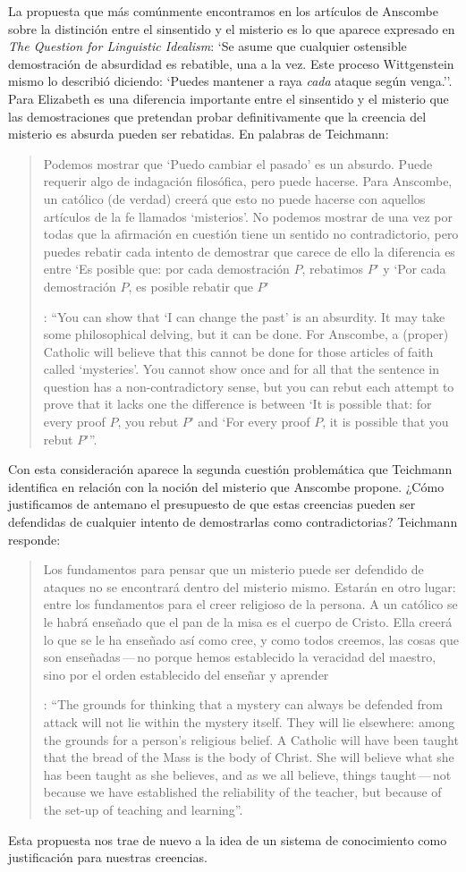La propuesta que más comúnmente encontramos en los artículos de Anscombe sobre la distinción entre el sinsentido y el misterio es lo que aparece expresado en \emph{The Question for Linguistic Idealism}: \enquote*{Se asume que cualquier ostensible demostración de absurdidad es rebatible, una a la vez. Este proceso Wittgenstein mismo lo describió diciendo: `Puedes mantener a raya \emph{cada} ataque según venga.'}. Para Elizabeth es una diferencia importante entre el sinsentido y el misterio que las demostraciones que pretendan probar definitivamente que la creencia del misterio es absurda pueden ser rebatidas. En palabras de Teichmann: \blockquote[{\Cite[213-214]{teichmann2008ans}}: \enquote{You can show that `I can change the past' is an absurdity. It may take some philosophical delving, but it can be done. For Anscombe, a (proper) Catholic will believe that this cannot be done for those articles of faith called `mysteries'. \textelp{} You cannot show once and for all that the sentence in question has a non-contradictory sense, but you can rebut each attempt to prove that it lacks one \textelp{} the difference is between `It is possible that: for every proof $P$, you rebut $P$' and `For every proof $P$, it is possible that you rebut $P$'}.]{Podemos mostrar que `Puedo cambiar el pasado' es un absurdo. Puede requerir algo de indagación filosófica, pero puede hacerse. Para Anscombe, un católico (de verdad) creerá que esto no puede hacerse con aquellos artículos de la fe llamados `misterios'. \textelp{} No podemos mostrar de una vez por todas que la afirmación en cuestión tiene un sentido no contradictorio, pero puedes rebatir cada intento de demostrar que carece de ello \textelp{} la diferencia es entre `Es posible que: por cada demostración $P$, rebatimos $P$' y `Por cada demostración $P$, es posible rebatir que $P$'}. Con esta consideración aparece la segunda cuestión problemática que Teichmann identifica en relación con la noción del misterio que Anscombe propone. ¿Cómo justificamos de antemano el presupuesto de que estas creencias pueden ser defendidas de cualquier intento de demostrarlas como contradictorias? Teichmann responde: \blockquote[{\Cite[213-214]{teichmann2008ans}}: \enquote{The grounds for thinking that a mystery can always be defended from attack will not lie within the mystery itself. They will lie elsewhere: among the grounds for a person's religious belief. A Catholic will have been taught that the bread of the Mass is the body of Christ. She will believe what she has been taught as she believes, and as we all believe, things taught\,---\,not because we have established the reliability of the teacher, but because of the set-up of teaching and learning}.]{Los fundamentos para pensar que un misterio puede ser defendido de ataques no se encontrará dentro del misterio mismo. Estarán en otro lugar: entre los fundamentos para el creer religioso de la persona. A un católico se le habrá enseñado que el pan de la misa es el cuerpo de Cristo. Ella creerá lo que se le ha enseñado así como cree, y como todos creemos, las cosas que son enseñadas\,---\,no porque hemos establecido la veracidad del maestro, sino por el orden establecido del enseñar y aprender}. Esta propuesta nos trae de nuevo a la idea de un sistema de conocimiento como justificación para nuestras creencias.

